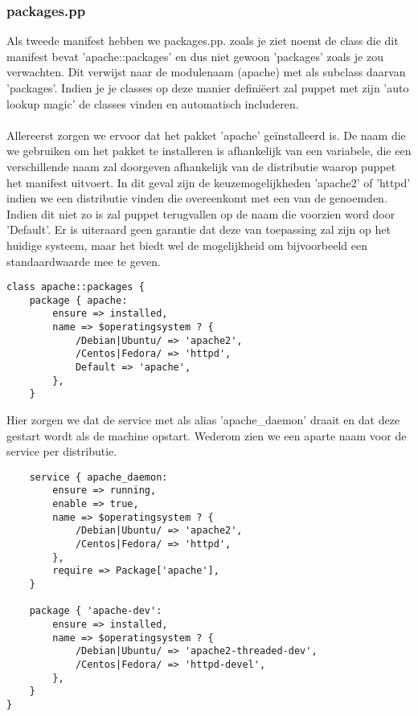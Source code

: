 \subsubsection{packages.pp}
Als tweede manifest hebben we packages.pp. zoals je ziet noemt de class die dit manifest bevat 'apache::packages' en dus niet gewoon 'packages' zoals je zou verwachten. Dit verwijst naar de modulenaam (apache) met als subclass daarvan 'packages'. Indien je je classes op deze manier defini\"eert zal puppet met zijn 'auto lookup magic' de classes vinden en automatisch includeren.\\\\
Allereerst zorgen we ervoor dat het pakket 'apache' ge\"installeerd is. De naam die we gebruiken om het pakket te installeren is afhankelijk van een variabele, die een verschillende naam zal doorgeven afhankelijk van de distributie waarop puppet het manifest uitvoert. In dit geval zijn de keuzemogelijkheden 'apache2' of 'httpd' indien we een distributie vinden die overeenkomt met een van de genoemden. Indien dit niet zo is zal puppet terugvallen op de naam die voorzien word door 'Default'. Er is uiteraard geen garantie dat deze van toepassing zal zijn op het huidige systeem, maar het biedt wel de mogelijkheid om bijvoorbeeld een standaardwaarde mee te geven.
\begin{code}
\begin{lstlisting}[tabsize=4]
class apache::packages {
	package { apache:
		ensure => installed,
		name => $operatingsystem ? {
			/Debian|Ubuntu/ => 'apache2',
			/Centos|Fedora/ => 'httpd',
			Default => 'apache',
		},
	}
\end{lstlisting}
\end{code}
%
Hier zorgen we dat de service met als alias 'apache\_daemon' draait en dat deze gestart wordt als de machine opstart. Wederom zien we een aparte naam voor de service per distributie.
\begin{code}
\begin{lstlisting}
	service { apache_daemon:
		ensure => running,
		enable => true,
		name => $operatingsystem ? {
			/Debian|Ubuntu/ => 'apache2',
			/Centos|Fedora/ => 'httpd',
		},
		require => Package['apache'],
	}

	package { 'apache-dev':
		ensure => installed,
		name => $operatingsystem ? {
			/Debian|Ubuntu/ => 'apache2-threaded-dev',
			/Centos|Fedora/ => 'httpd-devel',
		},
	}
}
\end{lstlisting}
\end{code}
